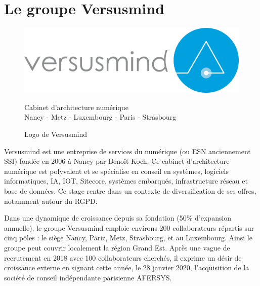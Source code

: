 \documentclass[12pt, a4paper]{report}
\newcommand\tab[1][1cm]{\hspace*{#1}}
\begin{document}
\section{Le groupe Versusmind}
\begin{figure}[H]
    \centering
    \includegraphics[width=.8\textwidth]{versusmind.png}
    \begin{center}
        \color{gray} Cabinet d'architecture numérique\\
        \scriptsize\color{gray}Nancy \hyp{} Metz \hyp{} Luxembourg \hyp{} Paris \hyp{} Strasbourg
    \end{center}
    \caption{Logo de Versusmind}
\end{figure}
\tab{}Versusmind est une entreprise de services du numérique (ou ESN anciennement SSI) fondée en 2006
à Nancy par Benoît Koch. Ce cabinet d’architecture numérique est polyvalent et se spécialise en conseil
en systèmes, logiciels informatiques, IA, IOT, Sitecore, systèmes embarqués, infrastructure réseau et
base de données. Ce stage rentre dans un contexte de diversification de ses offres, notamment autour
du RGPD.\newline

Dans une dynamique de croissance depuis sa fondation (50\% d’expansion annuelle), le groupe
Versusmind emploie environs 200 collaborateurs répartis sur cinq pôles : le siège Nancy, Pariz, Metz,
Strasbourg, et au Luxembourg. Ainsi le groupe peut couvrir localement la région Grand Est. Après une
vague de recrutement en 2018 avec 100 collaborateurs cherchés, il exprime un désir de croissance
externe en signant cette année, le 28 janvier 2020, l’acquisition de la société de conseil indépendante
parisienne AFERSYS.
\end{document}
